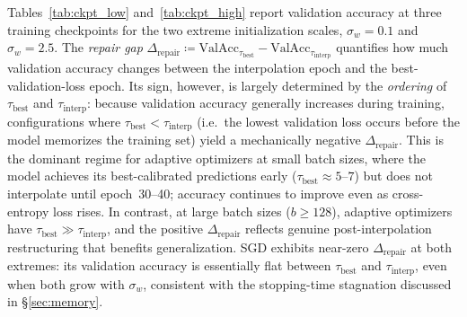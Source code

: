 \documentclass{article}
\newcommand{\sigw}{\sigma_w}
\newcommand{\taubest}{\tau_{\mathrm{best}}}
\newcommand{\tauinterp}{\tau_{\mathrm{interp}}}
\begin{document}
Tables~\ref{tab:ckpt_low} and~\ref{tab:ckpt_high} report validation accuracy at three training checkpoints for the two extreme initialization
scales, $\sigma_w = 0.1$  and $\sigma_w = 2.5$.
The \emph{repair gap}
$\Delta_{\mathrm{repair}} \coloneqq
\mathrm{ValAcc}_{\tau_{\mathrm{best}}} -
\mathrm{ValAcc}_{\tau_{\mathrm{interp}}}$
quantifies how much validation accuracy changes between the
interpolation epoch and the best-validation-loss epoch.
Its sign, however, is largely determined by the \emph{ordering} of
$\tau_{\mathrm{best}}$ and $\tau_{\mathrm{interp}}$: because validation
accuracy generally increases during training, configurations where
$\tau_{\mathrm{best}} < \tau_{\mathrm{interp}}$ (i.e.\ the lowest
validation loss occurs before the model memorizes the training set)
yield a mechanically negative $\Delta_{\mathrm{repair}}$.
This is the dominant regime for adaptive optimizers at small batch sizes,
where the model achieves its best-calibrated predictions early
($\tau_{\mathrm{best}} \approx 5$--$7$) but does not interpolate until
epoch~30--40; accuracy continues to improve even as cross-entropy loss
rises.
In contrast, at large batch sizes ($b \geq 128$), adaptive optimizers
have $\tau_{\mathrm{best}} \gg \tau_{\mathrm{interp}}$, and the
positive $\Delta_{\mathrm{repair}}$ reflects genuine post-interpolation
restructuring that benefits generalization.
SGD exhibits near-zero $\Delta_{\mathrm{repair}}$ at both extremes:
its validation accuracy is essentially flat between $\taubest$ and
$\tauinterp$, even when both grow with $\sigw$, consistent with the
stopping-time stagnation discussed in \S\ref{sec:memory}.
\end{document}
